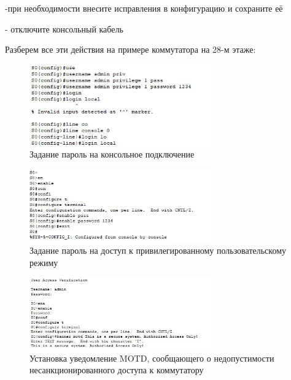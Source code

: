 \documentclass[bachelor, och, labwork]{shiza}
\begin{document}
\begin{enumerate}
    -при необходимости внесите исправления в конфигурацию и сохраните её
    
    - отключите консольный кабель

    Разберем все эти действия на примере коммутатора на 28-м этаже:

    \begin{figure}[H]
        \centering      %
        \includegraphics[width=0.7\textwidth]{3}
        \caption{Задание пароль на консольное подключение}
        \label{fig:image1}
    \end{figure}
    
    \begin{figure}[H]
        \centering      %
        \includegraphics[width=0.7\textwidth]{4}
        \caption{Задание пароль на доступ к привилегированному пользовательскому режиму}
        \label{fig:image1}
    \end{figure}

    \begin{figure}[H]
        \centering      %
        \includegraphics[width=0.7\textwidth]{5}
        \caption{Установка уведомление MOTD, сообщающего о недопустимости несанкционированного доступа к коммутатору}
        \label{fig:image1}
    \end{figure}


\end{enumerate}
\end{document}
